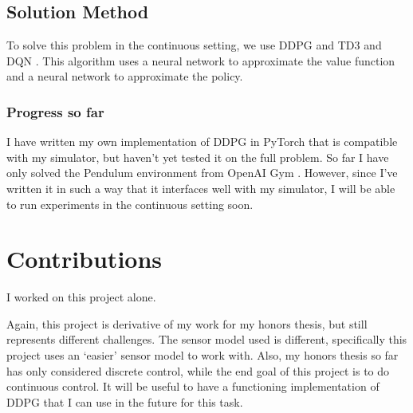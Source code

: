 \documentclass[10pt,twocolumn,letterpaper]{article}
\begin{document}
\subsection{Solution Method}
To solve this problem in the continuous setting, we use DDPG \cite{ddpg} and TD3 \cite{td3} and DQN \cite{dqn}.
This algorithm uses a neural network to approximate the value function and a neural network to approximate the policy.

\subsubsection{Progress so far}
I have written my own implementation of DDPG in PyTorch that is compatible with my simulator, but haven't yet tested it on the full problem.
So far I have only solved the Pendulum environment from OpenAI Gym \cite{gym}.
However, since I've written it in such a way that it interfaces well with my simulator, I will be able to run experiments in the continuous setting soon.

\section{Contributions}
I worked on this project alone.

Again, this project is derivative of my work for my honors thesis, but still represents different challenges. 
The sensor model used is different, specifically this project uses an `easier' sensor model to work with.
Also, my honors thesis so far has only considered discrete control, while the end goal of this project is to do continuous control.
It will be useful to have a functioning implementation of DDPG that I can use in the future for this task.
\end{document}
